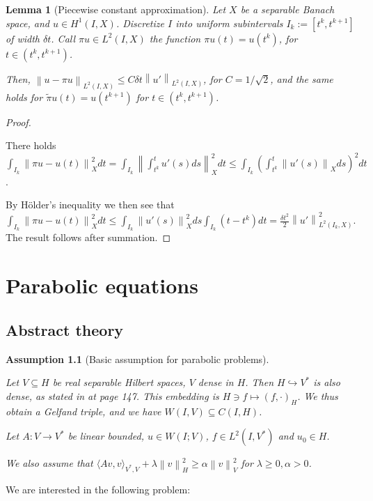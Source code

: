 \documentclass[english,a4paper,9pt,oneside]{scrbook}	%
\theoremstyle{break}
\newtheorem{lemma}[equation]{Lemma}
\newtheorem{ass}[equation]{Assumption}
\newenvironment{mproof}[1][\proofname]{%
  \begin{proof}[#1]$ $\par\nobreak\ignorespaces
}{%
  \end{proof}
}
\renewcommand*{\proofname}{Proof}
\theoremstyle{remark}
\newcommand{\ds}{\displaystyle}
\newcommand{\norm}[1]{\left\lVert#1\right\rVert}
\newcommand{\HN}[1]{\norm{#1}_{H}}
\newcommand{\VN}[1]{\norm{#1}_{V}}
\begin{document}
\begin{appendices}
\begin{lemma}[Piecewise constant approximation]
\label{lemma:pw_constant_appr}
Let $X$ be a separable Banach space, and $u \in H^1(I,X)$. Discretize $I$ into uniform subintervals $I_k:=[t^k,t^{k+1}]$ of width $\delta t$. Call $\pi u \in L^2(I,X)$ the function $\pi u(t)=u(t^{k})$, for $t \in (t^k,t^{k+1})$.

Then, $\norm{u-\pi u}_{L^2(I,X)}\leq C \delta t \norm{u'}_{L^2(I,X)}$, for $C=1/\sqrt{2}$, and the same holds for $\tilde{\pi}u(t) = u(t^{k+1})$ for $t \in (t^k,t^{k+1})$.

\end{lemma}

\begin{mproof}
There holds $\ds \int_{I_k}\norm{\pi u - u(t)}_X^2 dt = \int_{I_k} \norm{\int_{t^k}^{t} u'(s)ds}_X^2 dt\leq \int_{I_k}\left ( \int_{t^k}^{t} \norm{u'(s)}_X ds \right )^2 dt$. 

By Hölder's inequality we then see that $ \ds \int_{I_k}\norm{\pi u - u(t)}_X^2 dt \leq  \int_{I_k} \norm{u'(s)}_X^2 ds  \int_{I_k}(t-t^k)dt = \frac{\delta t ^2}{2} \norm{u'}_{L^2(I_k,X)}^2$. The result follows after summation.
\end{mproof}

\chapter{Parabolic equations}
\label{chap:parab_eq}

\section{Abstract theory}

\begin{ass}[Basic assumption for parabolic problems]
\label{ass:basic_par}

Let $V\subseteq H$ be real separable Hilbert spaces, $V$ dense in $H$. Then $H\hookrightarrow V^*$ is also dense, as stated in \cite{trol} at page 147. This embedding is $H \ni f \mapsto (f, \cdot )_H$. We thus obtain a Gelfand triple, and we have $W(I,V)\subseteq C(I,H)$.

Let $A:V\rightarrow V^* $ be linear bounded, $u \in W(I;V)$, $f \in L^2(I,V^*)$ and $u_0 \in H$.

We also assume that $\langle Av, v \rangle_{V^*,V}+ \lambda \HN{v}^2\geq \alpha \VN{v}^2$ for $\lambda \geq 0, \alpha >0$.
\end{ass}

We are interested in the following problem:


\end{appendices}
\end{document}
